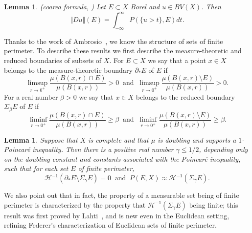 \documentclass[11pt, letterpaper]{amsart} %
\numberwithin{equation}{section}
\theoremstyle{plain}
\newtheorem{lemma}[equation]{Lemma}
\theoremstyle{definition}
\begin{document}
{\begin{lemma}\label{lem:coarea}(coarea formula, \emph{\cite[Proposition~4.2]{Miranda}})
Let $E\subset X$ Borel and $u\in BV (X)$. Then
\[
\Vert Du\Vert (E)=\int_{-\infty}^\infty P(\{ u>t\},E)dt.
\]
\end{lemma}

Thanks to the work of Ambrosio~\cite{Ambrosio}, we know the structure of sets of finite perimeter. To describe these results
we first describe the measure-theoretic and reduced boundaries of subsets of $X$. For $E\subset X$ we say that a point
$x\in X$ belongs to the measure-theoretic boundary $\partial_*E$ of $E$ if 
\begin{equation}\label{eq:MeasureTheoreticBoundary}
\limsup_{r\to 0^+}\frac{\mu(B(x,r)\cap E)}{\mu(B(x,r))}>0\ \text{ and }\ \limsup_{r\to 0^+}\frac{\mu(B(x,r)\setminus E)}{\mu(B(x,r))}>0.
\end{equation}
For a real number $\beta>0$ we say that $x\in X$ belongs to the reduced boundary $\Sigma_\beta E$ of $E$ if
\begin{equation}\label{eq:ReducedBoundary}
\liminf_{r\to 0^+}\frac{\mu(B(x,r)\cap E)}{\mu(B(x,r))}\ge\beta\ \text{ and }\ 
\liminf_{r\to 0^+}\frac{\mu(B(x,r)\setminus E)}{\mu(B(x,r))}\ge\beta.
\end{equation}

\begin{lemma}\label{lem:reducedBdy}
Suppose that $X$ is complete and that 
$\mu$ is doubling and supports a $1$-Poincar\'e inequality. Then there is a positive real number $\gamma\le 1/2$, 
depending only on the doubling constant and constants associated with the Poincar\'e inequality,
such that for each set $E$ of finite perimeter, 
\[
\mathcal{H}^{-1}(\partial_*E\setminus\Sigma_\gamma E)=0\ \text{ and }\
P(E,X)\approx \mathcal{H}^{-1}(\Sigma_\gamma E).
\]
\end{lemma}

We also point out that in fact, the property of a measurable set being of finite perimeter is characterized by
the property that $\mathcal{H}^{-1}(\Sigma_\gamma E)$ being finite; this result was first proved by Lahti~\cite{Lah-Fed},
and is new even in the Euclidean setting, refining Federer's characterization of Euclidean sets of finite perimeter.



}
\end{document}
